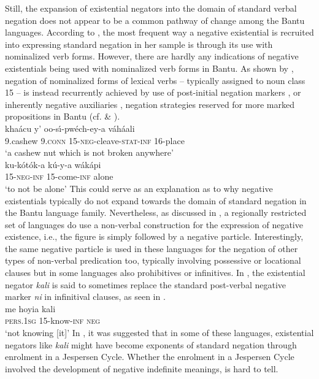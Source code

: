 \documentclass[output=paper]{langsci/langscibook}
\begin{document}
Still, the expansion of existential negators into the domain of standard
verbal negation does not appear to be a common pathway of change among the
Bantu languages. According to \citet{Veselinova2016}, the most frequent way
a negative existential is recruited into expressing standard negation in
her sample is through its use with nominalized verb forms. However, there
are hardly any indications of negative existentials being used with
nominalized verb forms in Bantu. As shown by
\citet{Guldemann1996,Guldemann1999}, negation of nominalized forms of
lexical verbs -- typically assigned to noun class 15 -- is instead recurrently achieved by use of post-initial negation markers , or inherently negative auxiliaries , negation strategies reserved for more marked propositions in Bantu (cf.  \& ).
%
\ea\label{ex:shangaji-cashew}
\\
\gll kha{\'a}cu y' oo-s\'\i-pw{\'e}ch-ey-a v{\'a}h{\'a}ali\\
9.cashew 9.\textsc{conn} 15-\textsc{neg}-cleave-\textsc{stat-inf} 16-place\\
\glt `a cashew nut which is not broken anywhere'
\z
%
\ea\label{ex:manda-alone}
\\
\gll ku-k{\'o}t{\'o}k-a k{\'u}-y-a w{\'a}k{\'a}pi\\
15-\textsc{neg-inf} 15-come-\textsc{inf} alone\\
\glt `to not be alone'
\z
%
This could serve as an explanation as to why negative existentials typically do not expand towards the domain of standard negation in the Bantu language family. Nevertheless, as discussed in , a regionally restricted set of languages do use a non-verbal construction for the expression of negative existence, i.e., the figure is simply followed by a negative particle. Interestingly, the same negative particle is used in these languages for the negation of other types of non-verbal predication too, typically involving possessive or locational clauses but in some languages also prohibitives or infinitives. In , the existential negator \textit{kali} is said to sometimes replace the standard post-verbal negative marker \textit{ni} in infinitival clauses, as seen in .
%
\ea\label{ex:mbete-know}
\\
\gll me hoyia kali\\
\textsc{pers.1sg} 15-know-\textsc{inf} \textsc{neg}\\
\glt `not knowing [it]'
\z
In , it was suggested that in some of these languages, existential negators like \textit{kali} might have become exponents of standard negation through enrolment in a Jespersen Cycle. Whether the enrolment in a Jespersen Cycle involved the development of negative indefinite meanings, is hard to tell.
\end{document}
